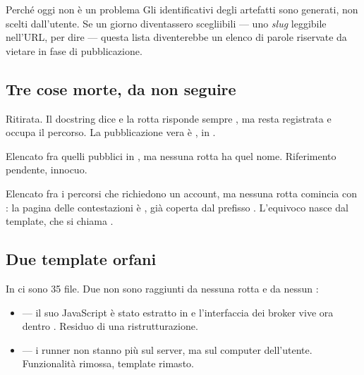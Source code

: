 \begin{nota}{Perché oggi non è un problema}
Gli identificativi degli artefatti sono generati, non scelti dall'utente. Se
un giorno diventassero scegliibili --- uno \emph{slug} leggibile nell'URL, per
dire --- questa lista diventerebbe un elenco di parole riservate da vietare in
fase di pubblicazione.
\end{nota}

\subsection{Tre cose morte, da non seguire}

\begin{description}[leftmargin = 1.6em, style = nextline, itemsep = 5pt]
  \item[\rotta{POST}{/api/market/publish}]
    Ritirata. Il docstring dice  e la rotta risponde
    sempre , ma resta registrata e occupa il percorso. La
    pubblicazione vera è , in
    .
  \item[L'endpoint \cod{auth\_google\_token}]
    Elencato fra quelli pubblici in , ma nessuna rotta ha
    quel nome. Riferimento pendente, innocuo.
  \item[Il prefisso \percorsoHTTP{/claim}]
    Elencato fra i percorsi che richiedono un account, ma nessuna rotta
    comincia con : la pagina delle contestazioni è
    , già coperta dal prefisso
    . L'equivoco nasce dal template, che si chiama
    .
\end{description}

\subsection{Due template orfani}

In  ci sono \num{35} file. Due non sono raggiunti
da nessuna rotta e da nessun :

\begin{itemize}
  \item {} --- il suo JavaScript è stato estratto in
         e l'interfaccia dei broker vive ora dentro
        . Residuo di una ristrutturazione.
  \item {} --- i runner non stanno più sul server, ma
        sul computer dell'utente. Funzionalità rimossa, template rimasto.
\end{itemize}

